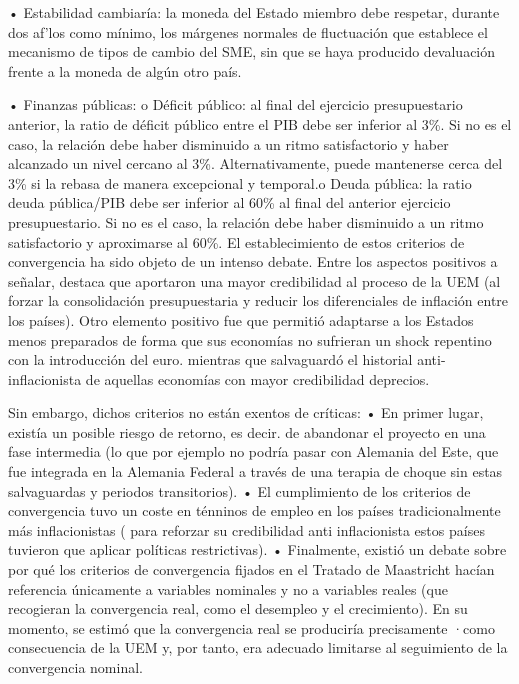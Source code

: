 \documentclass[10pt,a4paper]{article}
\begin{document}
• Estabilidad cambiaría: la moneda del Estado miembro debe respetar, durante dos af'los como mínimo, los márgenes normales de fluctuación que establece el mecanismo de tipos de cambio del SME, sin que se haya producido devaluación frente a la moneda de algún otro país.

• Finanzas públicas: o Déficit público: al final del ejercicio presupuestario anterior, la ratio de déficit público entre el PIB debe ser inferior al 3\%. Si no es el caso, la relación debe haber disminuido a un ritmo satisfactorio y haber alcanzado un nivel cercano al 3\%. Alternativamente, puede mantenerse cerca del 3\% si la rebasa de manera excepcional y temporal.o Deuda pública: la ratio deuda pública/PIB debe ser inferior al 60\% al final del anterior ejercicio presupuestario. Si no es el caso, la relación debe haber disminuido a un ritmo satisfactorio y aproximarse al 60\%. El establecimiento de estos criterios de convergencia ha sido objeto de un intenso debate. Entre los aspectos positivos a señalar, destaca que aportaron una mayor credibilidad al proceso de la UEM (al forzar la consolidación presupuestaria y reducir los diferenciales de inflación entre los países). Otro elemento positivo fue que permitió adaptarse a los Estados menos preparados de forma que sus economías no sufrieran un shock repentino con la introducción del euro. mientras que salvaguardó el historial anti-inflacionista de aquellas economías con mayor credibilidad deprecios. 

Sin embargo, dichos criterios no están exentos de críticas: 
• En primer lugar, existía un posible riesgo de retorno, es decir. de abandonar el proyecto en una fase intermedia (lo que por ejemplo no podría pasar con Alemania del Este, que fue integrada en la Alemania Federal a través de una terapia de choque sin estas salvaguardas y periodos transitorios). 
• El cumplimiento de los criterios de convergencia tuvo un coste en ténninos de empleo en los países tradicionalmente más inflacionistas ( para reforzar su credibilidad anti inflacionista estos países tuvieron que aplicar políticas restrictivas). 
• Finalmente, existió un debate sobre por qué los criterios de convergencia fijados en el Tratado de Maastricht hacían referencia únicamente a variables nominales y no a variables reales (que recogieran la convergencia real, como el desempleo y el crecimiento). En su momento, se estimó que la convergencia real se produciría precisamente ·como consecuencia de la UEM y, por tanto, era adecuado limitarse al seguimiento de la convergencia nominal. 
\end{document}
